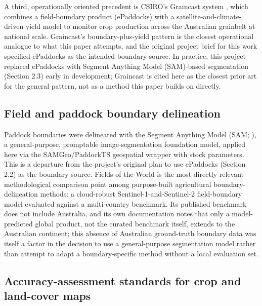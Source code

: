 A third, operationally oriented precedent is CSIRO's Graincast system \citep{lawes2022graincast}, which combines a field-boundary product (ePaddocks) with a satellite-and-climate-driven yield model to monitor crop production across the Australian grainbelt at national scale. Graincast's boundary-plus-yield pattern is the closest operational analogue to what this paper attempts, and the original project brief for this work specified ePaddocks as the intended boundary source. In practice, this project replaced ePaddocks with Segment Anything Model (SAM)-based segmentation (Section 2.3) early in development; Graincast is cited here as the closest prior art for the general pattern, not as a method this paper builds on directly.

\subsection{Field and paddock boundary delineation}\label{field-and-paddock-boundary-delineation}

Paddock boundaries were delineated with the Segment Anything Model (SAM; \citealp{kirillov2023sam}), a general-purpose, promptable image-segmentation foundation model, applied here via the SAMGeo/PaddockTS geospatial wrapper with stock parameters. This is a departure from the project's original plan to use ePaddocks (Section 2.2) as the boundary source. Fields of the World \citep{kerner2024fields} is the most directly relevant methodological comparison point among purpose-built agricultural boundary-delineation methods: a cloud-robust Sentinel-1-and-Sentinel-2 field-boundary model evaluated against a multi-country benchmark. Its published benchmark does not include Australia, and its own documentation notes that only a model-predicted global product, not the curated benchmark itself, extends to the Australian continent; this absence of Australian ground-truth boundary data was itself a factor in the decision to use a general-purpose segmentation model rather than attempt to adapt a boundary-specific method without a local evaluation set.

\subsection{Accuracy-assessment standards for crop and land-cover maps}\label{accuracy-assessment-standards-for-crop-and-land-cover-maps}

